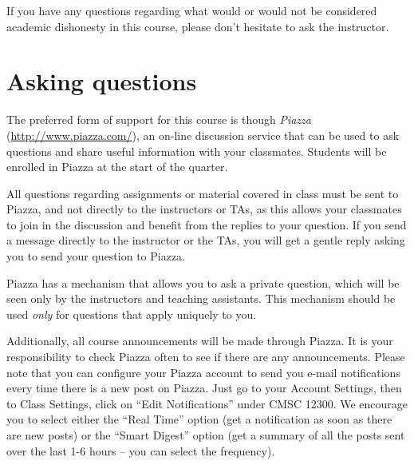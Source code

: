 \documentclass[11pt]{article}
\begin{document}
If you have any questions regarding what would or would not be
considered academic dishonesty in this course, please don't hesitate
to ask the instructor.

\section{Asking questions}
\label{asking}

The preferred form of support for this course is though \emph{Piazza}
(\url{http://www.piazza.com/}), an on-line discussion service that
can be used to ask questions and share useful information with your
classmates. Students will be enrolled in Piazza at the start of the
quarter.

All questions regarding assignments or material covered in class must
be sent to Piazza, and not directly to the instructors or TAs, as this
allows your classmates to join in the discussion and benefit from the
replies to your question. If you send a message directly to the
instructor or the TAs, you will get a gentle reply asking you to send
your question to Piazza. 

Piazza has a mechanism that allows you to ask a private question,
which will be seen only by the instructors and teaching assistants.
This mechanism should be used \emph{only} for questions that apply
uniquely to you.

Additionally, all course announcements will be made through Piazza.
It is your responsibility to check Piazza often to see if there are
any announcements. Please note that you can configure your Piazza account
to send you e-mail notifications every time there is a new post on
Piazza. Just go to your Account Settings, then to Class Settings, 
click on ``Edit Notifications'' under CMSC 12300. We 
encourage you to select either the ``Real Time'' option (get a notification
as soon as there are new posts) or the ``Smart Digest'' option (get
a summary of all the posts sent over the last 1-6 hours -- you can select
the frequency).



\end{document}
